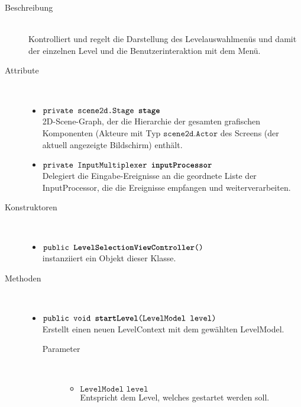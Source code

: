\begin{description}
\item[Beschreibung] \hfill \\ Kontrolliert und regelt die Darstellung des Levelauswahlmenüs und damit der einzelnen Level und die Benutzerinteraktion mit dem Menü.
\item[Attribute] \hfill \\
	\vspace{-.8cm}
	\begin{itemize}	
		\item $\texttt{private scene2d.Stage \textbf{stage}}$ \\ 2D-Scene-Graph, der die Hierarchie der gesamten grafischen Komponenten (Akteure mit Typ $\texttt{scene2d.Actor}$ des Screens (der aktuell angezeigte Bildschirm) enthält. 
		\item $\texttt{private InputMultiplexer \textbf{inputProcessor}}$ \\ Delegiert die Eingabe-Ereignisse an die geordnete Liste der InputProcessor, die die Ereignisse empfangen und weiterverarbeiten.
		\end{itemize}
	
\item[Konstruktoren] \hfill \\
	\vspace{-.8cm}
	\begin{itemize}
		\item $\texttt{public \textbf{LevelSelectionViewController}()}$ \\ instanziiert ein Objekt dieser Klasse.

	\end{itemize}
	
\item[Methoden] \hfill \\
	\vspace{-.8cm}
	\begin{itemize}
		\item $\texttt{public void \textbf{startLevel}(LevelModel level)}$ \\ Erstellt einen neuen LevelContext mit dem gewählten LevelModel.
			\begin{description}
			\item[Parameter] \hfill \\
			\vspace{-.8cm}
			\begin{itemize}
				\item $\texttt{LevelModel level}$ \\ Entspricht dem Level, welches gestartet werden soll.
			\end{itemize}
			\end{description}
			

		\end{itemize}
	\end{description}



